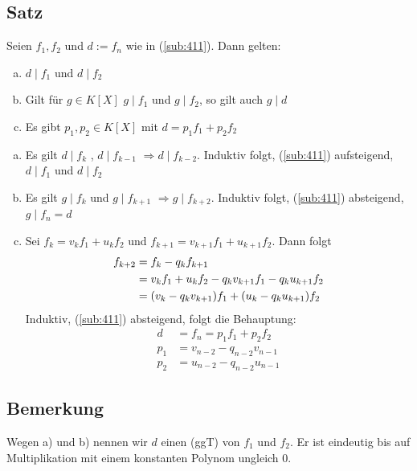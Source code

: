 \subsection[Satz über die Eigenschaften des Ergebnisses des Euklid'schen Algorithmus]{Satz} %
\label{sub:413}
Seien $f_1, f_2$ und $d := f_n$ wie in (\ref{sub:411}). Dann gelten:
\begin{enumerate}[a)]
	\item $d \mid f_1$ und $d \mid f_2$
	\item Gilt für $g \in K[X]$ $g \mid f_1 $ und $ g\mid f_2$, so gilt auch $g \mid d$
	\item \label{413:enum:c} Es gibt $p_1, p_2 \in K[X]$ mit $d= p_1f_1 + p_2f_2$
\end{enumerate}
\begin{enumerate}[a)]
	\item Es gilt $d\mid f_k$ , $d\mid f_{k-1}$ $\Rightarrow d\mid f_{k-2}$. Induktiv folgt, (\ref{sub:411}) aufsteigend, $d\mid f_1$ und $d\mid f_2$
	\item Es gilt $g\mid f_k$ und $g\mid f_{k+1}$ $\Longrightarrow g\mid f_{k+2}$. Induktiv folgt, (\ref{sub:411}) absteigend, $g\mid f_n = d$
	\item Sei $f_k = v_k f_1 + u_k f_2$ und $f_{k+1}= v_{k+1}f_1 + u_{k+1}f_2$. Dann folgt 
	\begin{align*}
		f_{k+2} &= f_k - q_k f_{k+1} \\
		&= v_k f_1 + u_k f_2 - q_k v_{k+1} f_1 - q_k u_{k+1} f_2 \\
		&= (v_k - q_k v_{k+1})f_1  +  (u_k - q_k u_{k+1})f_2 
	\end{align*}
	Induktiv, (\ref{sub:411}) absteigend, folgt die Behauptung:
	\begin{align*}
		d &= f_n = p_1 f_1 + p_2 f_2 \\
		p_1 &= v_{n-2} - q_{n-2}v_{n-1} \\
		p_2 &= u_{n-2} - q_{n-2} u_{n-1} \tag*{$\square$}
	\end{align*}
\end{enumerate}


\subsection[Bemerkung größter gemeinsamer Teiler (ggT)]{Bemerkung} %
\label{sub:414}
Wegen a) und b) nennen wir $d$ einen (ggT) von $f_1$ und $f_2$. Er ist eindeutig bis auf Multiplikation
mit einem konstanten Polynom ungleich $0$.

